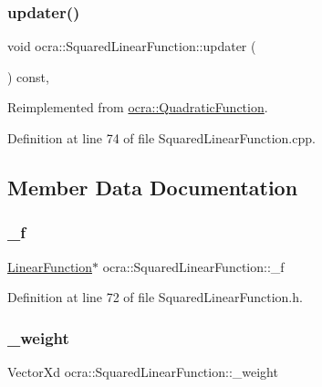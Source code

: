 \subsubsection{\texorpdfstring{updater()}{updater()}}
{\footnotesize\ttfamily void ocra\+::\+Squared\+Linear\+Function\+::updater (\begin{DoxyParamCaption}{ }\end{DoxyParamCaption}) const\hspace{0.3cm}{\ttfamily [protected]}, {\ttfamily [virtual]}}



Reimplemented from \hyperlink{classocra_1_1QuadraticFunction_aeaa560b1771f4024755753236fd69779}{ocra\+::\+Quadratic\+Function}.



Definition at line 74 of file Squared\+Linear\+Function.\+cpp.



\subsection{Member Data Documentation}
\hypertarget{classocra_1_1SquaredLinearFunction_a9848211537e6dc386ab237e6a1e233dc}{}\label{classocra_1_1SquaredLinearFunction_a9848211537e6dc386ab237e6a1e233dc} 
\subsubsection{\texorpdfstring{\+\_\+f}{\_f}}
{\footnotesize\ttfamily \hyperlink{classocra_1_1LinearFunction}{Linear\+Function}$\ast$ ocra\+::\+Squared\+Linear\+Function\+::\+\_\+f\hspace{0.3cm}{\ttfamily [protected]}}



Definition at line 72 of file Squared\+Linear\+Function.\+h.

\hypertarget{classocra_1_1SquaredLinearFunction_ad21985a66257244ce79648a507ad5220}{}\label{classocra_1_1SquaredLinearFunction_ad21985a66257244ce79648a507ad5220} 
\subsubsection{\texorpdfstring{\+\_\+weight}{\_weight}}
{\footnotesize\ttfamily Vector\+Xd ocra\+::\+Squared\+Linear\+Function\+::\+\_\+weight\hspace{0.3cm}{\ttfamily [protected]}}



